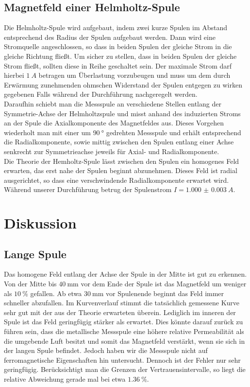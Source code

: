 \subsection{Magnetfeld einer Helmholtz-Spule}
Die Helmholtz-Spule wird aufgebaut, indem zwei kurze Spulen im Abstand entsprechend des Radius der Spulen aufgebaut werden. Dann wird eine Stromquelle angeschlossen, so dass in beiden Spulen der gleiche Strom in die gleiche Richtung fließt. Um sicher zu stellen, dass in beiden Spulen der gleiche Strom fließt, sollten diese in Reihe geschaltet sein. Der maximale Strom darf hierbei $ \SI{1}{A} $ betragen um Überlastung vorzubeugen und muss um dem durch Erwärmung zunehmenden ohmschen Widerstand der Spulen entgegen zu wirken gegebenen Falls während der Durchführung nachgeregelt werden. \\
Daraufhin schiebt man die Messspule an verschiedene Stellen entlang der Symmetrie-Achse der Helmholtzspule und misst anhand des induzierten Stroms an der Spule die Axialkomponente des Magnetfeldes aus. Dieses Vorgehen wiederholt man mit einer um $ \SI{90}{\degree} $ gedrehten Messspule und erhält entsprechend die Radialkomponente, sowie mittig zwischen den Spulen entlang einer Achse senkrecht zur Symmetrieachse jeweils für Axial- und Radialkomponente.\\
Die Theorie der Hemholtz-Spule lässt zwischen den Spulen ein homogenes Feld erwarten, das erst nahe der Spulen beginnt abzunehmen. Dieses Feld ist radial ausgerichtet, so dass eine verschwindende Radialkomponente erwartet wird. \\
Während unserer Durchführung betrug der Spulenstrom $ I= \SI{1.000(3)}{A} $.

\section{Diskussion}
\subsection{Lange Spule}
Das homogene Feld entlang der Achse der Spule in der Mitte ist gut zu erkennen. Von der Mitte bis $ \SI{40}{\milli\meter} $ vor dem Ende der Spule ist das Magnetfeld um weniger als $ \SI{10}{\percent} $ gefallen. Ab etwa $ \SI{30}{\milli\meter} $ vor Spulenende beginnt das Feld immer schneller abzufallen. Im Kurvenverlauf stimmt die tatsächlich gemessene Kurve sehr gut mit der aus der Theorie erwarteten überein. Lediglich im inneren der Spule ist das Feld geringfügig stärker als erwartet. Dies könnte darauf zurück zu führen sein, dass die metallische Messspule eine höhere relative Permeabilität als die umgebende Luft besitzt und somit das Magnetfeld verstärkt, wenn sie sich in der langen Spule befindet. Jedoch haben wir die Messspule nicht auf ferromagnetische Eigenschaften hin untersucht. Dennoch ist der Fehler nur sehr geringfügig. Berücksichtigt man die Grenzen der Vertrauensintervalle, so liegt die relative Abweichung gerade mal bei etwa $ \SI{1.36}{\percent} $.

